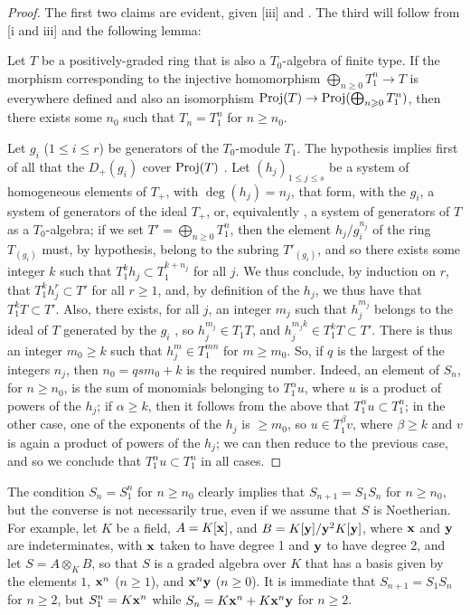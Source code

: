 \begin{proof}
The first two claims are evident, given [iii] and .
The third will follow from [i and iii] and the following lemma:
\begin{lemma}[8.2.14.1]
\label{II.8.2.14.1}
Let $T$ be a positively-graded ring that is also a $T_0$-algebra of finite type.
If the morphism corresponding to the injective homomorphism $\bigoplus_{n\geq0}T_1^n\to T$ is everywhere defined and also an isomorphism $\Proj(T)\to\Proj(\bigoplus_{n\geq0}T_1^n)$, then there exists some $n_0$ such that $T_n=T_1^n$ for $n\geq n_0$.
\end{lemma}

Let $g_i$ ($1\leq i\leq r$) be generators of the $T_0$-module $T_1$.
The hypothesis implies first of all that the $D_+(g_i)$ cover $\operatorname{Proj}(T)$ .
Let $(h_j)_{1\leq j\leq s}$ be a system of homogeneous elements of $T_+$, with $\deg(h_j)=n_j$, that form, with the $g_i$, a system of generators of the ideal $T_+$, or, equivalently , a system of generators of $T$ as a $T_0$-algebra;
if we set $T'=\bigoplus_{n\geq0}T_1^n$, then the element $h_j/g_i^{n_j}$ of the ring $T_{(g_i)}$ must, by hypothesis, belong to the subring $T'_{(g_i)}$, and so there exists some integer $k$ such that $T_1^k h_j\subset T_1^{k+n_j}$ for all $j$.
We thus conclude, by induction on $r$, that $T_1^k h_j^r \subset T'$ for all $r\geq1$, and, by definition of the $h_j$, we thus have that $T_1^k T\subset T'$.
Also, there exists, for all $j$, an integer $m_j$ such that $h_j^{m_j}$ belongs to the ideal of $T$ generated by the $g_i$ , so $h_j^{m_j}\in T_1 T$, and
$h_j^{m_j k}\in T_1^k T\subset T'$.
There is thus an integer $m_0\geq k$ such that $h_j^m\in T_1^{mn}$ for $m\geq m_0$.
So, if $q$ is the largest of the integers $n_j$, then $n_0=qsm_0+k$ is the required number.
Indeed, an element of $S_n$, for $n\geq n_0$, is the sum of monomials belonging to $T_1^\alpha u$, where $u$ is a product of powers of the $h_j$;
if $\alpha\geq k$, then it follows from the above that $T_1^\alpha u\subset T_1^n$;
in the other case, one of the exponents of the $h_j$ is $\geq m_0$, so $u\in T_1^\beta v$, where $\beta\geq k$ and $v$ is again a product of powers of the $h_j$;
we can then reduce to the previous case, and so we conclude that $T_1^\alpha u\subset T_1^n$ in all cases.
\end{proof}

\begin{remark}[8.2.15]
\label{II.8.2.15}
The condition $S_n=S_1^n$ for $n\geq n_0$ clearly implies that $S_{n+1}=S_1S_n$ for $n\geq n_0$, but the converse is not necessarily true, even if we assume that $S$ is Noetherian.
For example, let $K$ be a field, $A=K[\mathbf{x}]$, and $B=K[\mathbf{y}]/\mathbf{y}^2K[\mathbf{y}]$, where $\mathbf{x}$ and $\mathbf{y}$ are indeterminates, with $\mathbf{x}$ taken to have degree 1 and $\mathbf{y}$ to have degree 2, and let $S=A\otimes_K B$, so that $S$ is a graded algebra over $K$ that has a basis given by the elements $1$, $\mathbf{x}^n$ ($n\geq1$), and $\mathbf{x}^n\mathbf{y}$ ($n\geq0$).
It is immediate that $S_{n+1}=S_1S_n$ for $n\geq2$, but $S_1^n=K\mathbf{x}^n$ while $S_n=K\mathbf{x}^n+K\mathbf{x}^n\mathbf{y}$ for $n\geq2$.
\end{remark}


